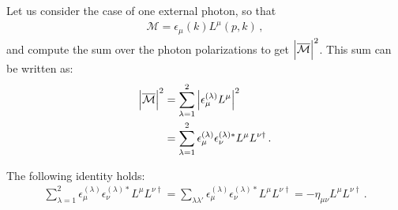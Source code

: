 \documentclass[main.tex]{subfiles}
\begin{document}
Let us consider the case of one external photon,  so that 
%
\begin{align}
\mathcal{M} = \epsilon_{\mu } (k) L^{\mu } (p, k)
\,,
\end{align}
%
and compute the sum over the photon polarizations to get \(\abs{\mathcal{\overline{M}}}^2\). 
This sum can be written as:
%
\begin{align}
\abs{\mathcal{\overline{M}}}^2 &=
\sum _{\lambda = 1}^{2} 
\abs{\epsilon_{\mu }^{(\lambda )} L^{\mu }}^2  \\
&=
\sum _{\lambda = 1}^{2} 
\epsilon_{\mu }^{(\lambda )} \epsilon^{(\lambda )*}_{\nu } L^{\mu }L^{\nu \dag}
\,.
\end{align}

\begin{claim}
The following identity holds:
\begin{align}
\sum _{\lambda = 1}^{2} 
\epsilon_{\mu }^{(\lambda )} \epsilon^{(\lambda )*}_{\nu }
L^{\mu } L^{\nu \dag}
= 
\sum _{\lambda \lambda '} 
\epsilon_{\mu }^{(\lambda )} \epsilon^{(\lambda )*}_{\nu }
L^{\mu } L^{\nu \dag}
= - \eta_{\mu \nu }
L^{\mu } L^{\nu \dag}
\,.
\end{align}
\end{claim}
\end{document}
